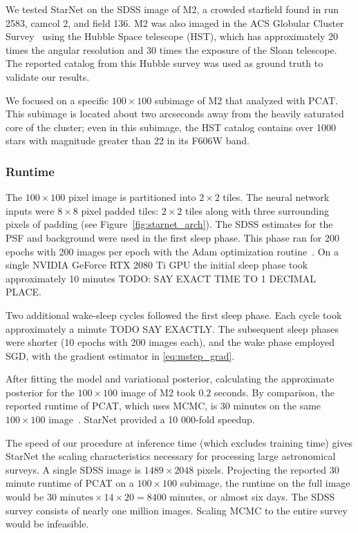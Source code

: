 \label{sec:results_on_m2}
We tested StarNet on the SDSS image of M2, a crowded starfield found in run 2583, camcol 2, and field 136.
M2 was also imaged in the ACS Globular Cluster Survey~\cite{Sarajedini_2007}
using the Hubble Space telescope (HST),
which has approximately 20 times the angular resolution and 30 times the exposure of the Sloan telescope. The reported catalog from this Hubble survey was used as ground truth to 
validate our results.

We focused on a specific $100 \times 100$ subimage of M2 that \cite{Portillo_2017, Feder_2019} analyzed with PCAT.
This subimage is located about two arcseconds away from the heavily saturated core of the cluster;
even in this subimage, the HST catalog contains over 1000 stars with magnitude greater than 22 in its F606W band.

\subsubsection{Runtime} 
\label{sec:runtime}
The $100 \times 100$ pixel image is partitioned into $2\times 2$ tiles. 
The neural network inputs were $8\times8$ pixel padded tiles: 
$2\times 2$ tiles along with three surrounding pixels of padding (see Figure~\ref{fig:starnet_arch}). 
The SDSS estimates for the PSF and background were used in the first sleep phase. 
This phase ran for 200 epochs with 200 images per epoch with  
the Adam optimization routine~\cite{kingma2014adam}. 
On a single NVIDIA GeForce RTX 2080 Ti GPU 
the initial sleep phase took approximately 10 minutes
TODO: SAY EXACT TIME TO 1 DECIMAL PLACE. 

Two additional wake-sleep cycles followed the first sleep phase. 
Each cycle took approximately a minute TODO SAY EXACTLY. The subsequent sleep phases were shorter (10 epochs with 200 images each), and the wake phase employed SGD, with the gradient estimator in \eqref{eq:mstep_grad}.

After fitting the model and variational posterior, calculating the approximate posterior for the $100 \times 100$ image of M2 took $0.2$ seconds. 
By comparison, the reported runtime of PCAT, which uses MCMC, is 30 minutes on the same $100 \times 100$ image~\cite{Feder_2019}. StarNet provided a 
10 000-fold speedup. 

The speed of our procedure at inference time (which excludes training time) gives StarNet the scaling characteristics necessary for processing large astronomical surveys. 
A single SDSS image is $1489 \times 2048$ pixels. 
Projecting the reported 30 minute runtime of PCAT on a $100\times100$ subimage, 
the runtime on the full image would be $30\text{ minutes} \times 14 \times 20 = 8400$ minutes, or almost six days. 
The SDSS survey consists of nearly one million images. Scaling MCMC to the entire survey would be infeasible. 

